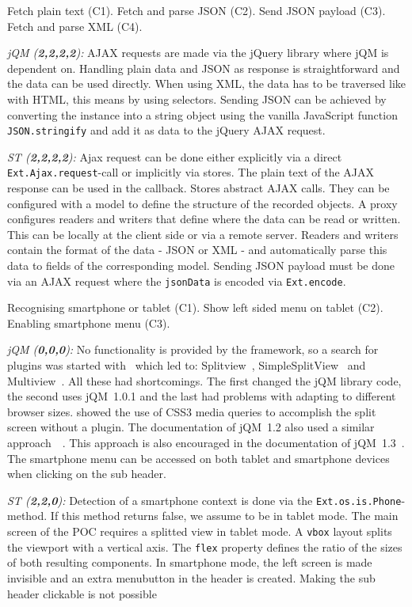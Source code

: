 \documentclass[a4paper]{artikel3}
\newcommand{\code}[1]{\texttt{#1}}
\newcommand{\setspace}[0]{\vspace{2mm}}
\renewcommand{\paragraph}[1]{\setspace \noindent {\bf #1}  }
\newcommand{\framework}[2]{ \emph{#1 (\textbf{#2}): }} %
\newcommand{\challenge}[1]{\paragraph{#1}}
\begin{document}
\challenge{AJAX: text, JSON \& XML}
Fetch plain text (C1).
Fetch and parse JSON (C2).
Send JSON payload (C3).
Fetch and parse XML (C4).

\framework{jQM}{2,2,2,2}
AJAX requests are made via the jQuery library where jQM is dependent on.
Handling plain data and JSON as response is straightforward and the data can be used directly.
When using XML, the data has to be traversed like with HTML, this means by using selectors.
Sending JSON can be achieved by converting the instance into a string object using the vanilla JavaScript function \code{JSON.stringify} and add it as data to the jQuery AJAX request.

\framework{ST}{2,2,2,2}
Ajax request can be done either explicitly via a direct \code{Ext.Ajax.request}-call or implicitly via stores.  
The plain text of the AJAX response can be used in the callback.  
Stores abstract AJAX calls.  
They can be configured with a model to define the structure of the recorded objects.  
A proxy configures readers and writers that define where the data can be read or written.  
This can be locally at the client side or via a remote server.  
Readers and writers contain the format of the data - JSON or XML - and automatically parse this data to fields of the corresponding model. 
Sending JSON payload must be done via an AJAX request where the \code{jsonData} is encoded via \code{Ext.encode}.

\challenge{Device-specific layout (C1,C2,C3)}
Recognising smartphone or tablet (C1).
Show left sided menu on tablet (C2).
Enabling smartphone menu (C3).

\framework{jQM}{0,0,0}
No functionality is provided by the framework, so a search for plugins was started with~\cite{Deering2012} which led to: Splitview~\cite{Rahman2013}, SimpleSplitView~\cite{Yared2013} and Multiview~\cite{Franck2012}. 
All these had shortcomings. The first changed the jQM library code, the second uses jQM~1.0.1 and the last had problems with adapting to different browser sizes.
\cite{Hadlock2012} showed the use of CSS3 media queries to accomplish the split screen without a plugin.
The documentation of jQM~1.2 also used a similar approach~~\cite{JQuery2012b}.
This approach is also encouraged in the documentation of jQM~1.3~\cite{JQuery2013e}.
The smartphone menu can be accessed on both tablet and smartphone devices when clicking on the sub header.

\framework{ST}{2,2,0}
Detection of a smartphone context is done via the \code{Ext.os.is.Phone}-method.  
If this method returns false,  we assume to be in tablet mode.    
The main screen of the POC requires a splitted view in tablet mode.  
A \code{vbox} layout splits the viewport with a vertical axis.  
The \code{flex} property defines the ratio of the sizes of both resulting components.  
In smartphone mode,  the left screen is made invisible and an extra menubutton in the header is created.  
Making the sub header clickable is not possible  
\end{document}

